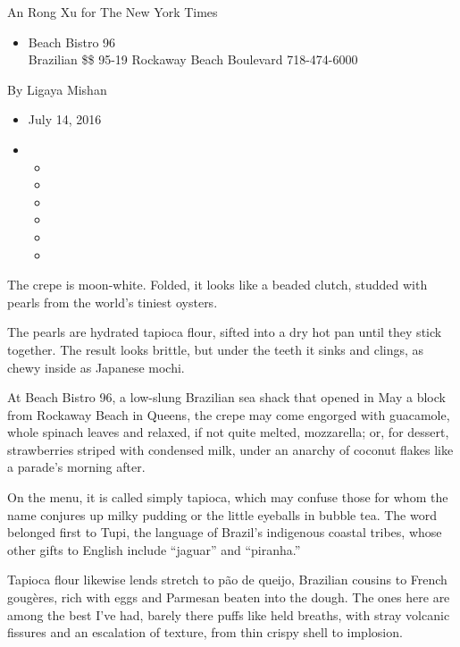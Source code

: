 An Rong Xu for The New York Times

\begin{itemize}
\tightlist
\item
  Beach Bistro 96\\
  Brazilian \$\$ 95-19 Rockaway Beach Boulevard 718-474-6000
\end{itemize}

By Ligaya Mishan

\begin{itemize}
\item
  July 14, 2016
\item
  \begin{itemize}
  \item
  \item
  \item
  \item
  \item
  \item
  \end{itemize}
\end{itemize}

The crepe is moon-white. Folded, it looks like a beaded clutch, studded
with pearls from the world's tiniest oysters.

The pearls are hydrated tapioca flour, sifted into a dry hot pan until
they stick together. The result looks brittle, but under the teeth it
sinks and clings, as chewy inside as Japanese mochi.

At Beach Bistro 96, a low-slung Brazilian sea shack that opened in May a
block from Rockaway Beach in Queens, the crepe may come engorged with
guacamole, whole spinach leaves and relaxed, if not quite melted,
mozzarella; or, for dessert, strawberries striped with condensed milk,
under an anarchy of coconut flakes like a parade's morning after.

On the menu, it is called simply tapioca, which may confuse those for
whom the name conjures up milky pudding or the little eyeballs in bubble
tea. The word belonged first to Tupi, the language of Brazil's
indigenous coastal tribes, whose other gifts to English include
``jaguar'' and ``piranha.''

Tapioca flour likewise lends stretch to pão de queijo, Brazilian cousins
to French gougères, rich with eggs and Parmesan beaten into the dough.
The ones here are among the best I've had, barely there puffs like held
breaths, with stray volcanic fissures and an escalation of texture, from
thin crispy shell to implosion.

